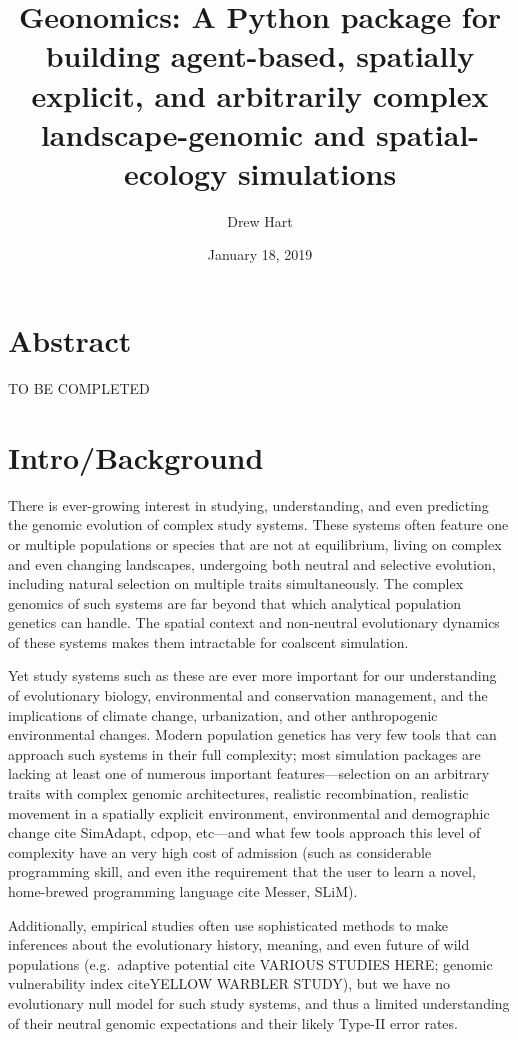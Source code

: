 ﻿\documentclass{article}
\title{Geonomics: A Python package for building agent-based, spatially explicit, and arbitrarily complex landscape-genomic and spatial-ecology simulations}
\author{Drew Hart}
\date{January 18, 2019}
\begin{document}
\maketitle

\section{Abstract}

{\LARGE TO BE COMPLETED}


\section{Intro/Background}
There is ever-growing interest in studying, understanding, and even predicting
the genomic evolution of complex study systems. 
These systems often feature one or multiple populations or species that are not
at equilibrium, living on complex and even changing landscapes, undergoing
both neutral and selective evolution, including natural selection on multiple
traits simultaneously.
The complex genomics of such systems are far beyond that which analytical
population genetics can handle. The spatial context and non-neutral evolutionary
dynamics of these systems makes them intractable for coalscent simulation.

Yet study systems such as these are ever more important for our understanding
of evolutionary biology, environmental and conservation management, and the
implications of climate change, urbanization, and other anthropogenic
environmental changes.
Modern population genetics has very few tools that can approach
such systems in their full complexity; most simulation packages are lacking
at least one of numerous important features---selection on an arbitrary traits
with complex genomic architectures, realistic recombination,
realistic movement in a spatially explicit environment,
environmental and demographic change 
{\large cite SimAdapt, cdpop, etc}---and what few tools approach
this level of complexity have an very high cost of admission
(such as considerable programming skill, and even ithe requirement
that the user to learn a novel, home-brewed programming language
{\large cite Messer, SLiM}). 

Additionally, empirical studies often use sophisticated methods
to make inferences about the evolutionary history, meaning, and
even future of wild populations (e.g.\ adaptive potential
{\large cite VARIOUS STUDIES HERE}; genomic vulnerability index
{\large citeYELLOW WARBLER STUDY}), but we have no evolutionary
null model for such study systems, and thus a limited understanding
of their neutral genomic expectations and their likely Type-II error rates.
\end{document}
